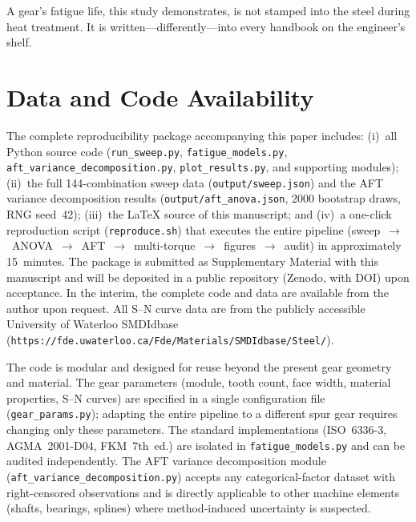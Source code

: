 \documentclass[twocolumn,12pt,a4paper]{article}
\begin{document}
\begin{enumerate}
\medskip
\noindent A gear's fatigue life, this study demonstrates, is not stamped
into the steel during heat treatment. It is written---differently---into
every handbook on the engineer's shelf.
\end{enumerate}

\section*{Data and Code Availability}

The complete reproducibility package accompanying this paper includes:
(i)~all Python source code (\texttt{run\_sweep.py},
\texttt{fatigue\_models.py}, \texttt{aft\_variance\_decomposition.py},
\texttt{plot\_results.py}, and supporting modules);
(ii)~the full 144-combination sweep data
(\texttt{output/sweep.json}) and the AFT variance decomposition
results (\texttt{output/aft\allowbreak\_anova\allowbreak.json},
2000 bootstrap draws, RNG seed~42);
(iii)~the LaTeX source of this manuscript; and
(iv)~a one-click reproduction script (\texttt{reproduce.sh}) that
executes the entire pipeline (sweep~$\rightarrow$~ANOVA~$\rightarrow$~AFT~$\rightarrow$~multi-torque~$\rightarrow$~figures~$\rightarrow$~audit)
in approximately 15~minutes.
The package is submitted as Supplementary Material with this
manuscript and will be deposited in a public repository (Zenodo,
with DOI) upon acceptance. In the interim, the complete code and
data are available from the author upon request. All S--N curve data are from the
publicly accessible University of Waterloo SMDIdbase
(\texttt{https://fde.uwaterloo.ca/\allowbreak Fde/Materials/\allowbreak SMDIdbase/Steel/}).

The code is modular and designed for reuse beyond the present gear
geometry and material. The gear parameters (module, tooth count, face
width, material properties, S--N curves) are specified in a single
configuration file (\texttt{gear\_params.py}); adapting the entire
pipeline to a different spur gear requires changing only these
parameters. The standard implementations (ISO~6336-3, AGMA~2001-D04,
FKM~7th~ed.) are isolated in \texttt{fatigue\_models.py} and can be
audited independently. The AFT variance decomposition module
(\texttt{aft\_variance\_decomposition.py}) accepts any
categorical-factor dataset with right-censored observations and is
directly applicable to other machine elements (shafts, bearings,
splines) where method-induced uncertainty is suspected.
\end{document}
